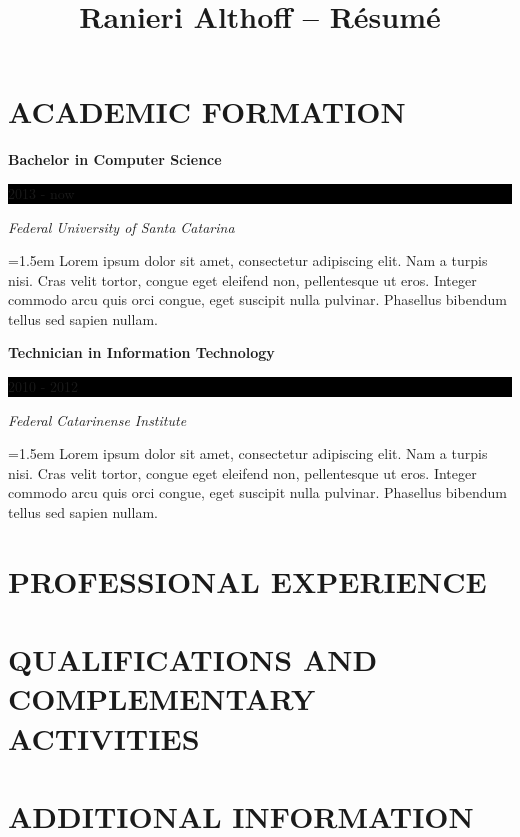 \documentclass[10pt]{article}
\newcommand{\sectiontitle}[1]{\section*{\uppercase{#1}}}
\begin{document}
 \selectfont

\title{Ranieri Althoff -- Résumé}

\sectiontitle{Academic Formation}
\noindent \textbf{Bachelor in Computer Science} \hfill
\colorbox{black}{
	\parbox{8em}{
		\hfill \color{white} 2013 - now
	}
} \par
\noindent \textit{Federal University of Santa Catarina} \par
\noindent \hangindent=1.5em  \small Lorem ipsum dolor sit amet,
	consectetur adipiscing elit. Nam a turpis nisi. Cras velit tortor, congue
	eget eleifend non, pellentesque ut eros.  Integer commodo arcu quis orci
	congue, eget suscipit nulla pulvinar. Phasellus bibendum tellus sed
	sapien nullam. \par
\normalsize
\vspace{1em}

\noindent \textbf{Technician in Information Technology} \hfill
\colorbox{black}{
	\parbox{8em}{
		\hfill \color{white} 2010 - 2012
	}
} \par
\noindent \textit{Federal Catarinense Institute} \par
\noindent \hangindent=1.5em  \small Lorem ipsum dolor sit amet,
	consectetur adipiscing elit. Nam a turpis nisi. Cras velit tortor, congue
	eget eleifend non, pellentesque ut eros.  Integer commodo arcu quis orci
	congue, eget suscipit nulla pulvinar. Phasellus bibendum tellus sed
	sapien nullam. \par
\normalsize
\vspace{1em}


\sectiontitle{Professional Experience}


\sectiontitle{Qualifications and Complementary Activities}


\sectiontitle{Additional Information}
\end{document}
